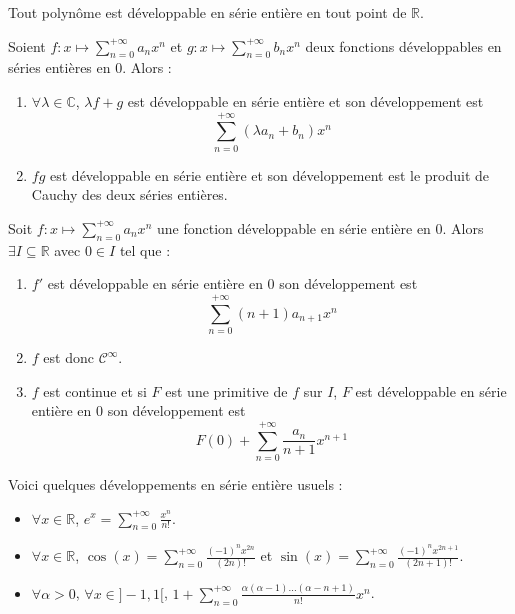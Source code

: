 
  \begin{example}
    Tout polynôme est développable en série entière en tout point de $\mathbb{R}$.
  \end{example}

  \begin{proposition}
    Soient $f : x \mapsto \sum_{n=0}^{+\infty} a_n x^n$ et $g : x \mapsto \sum_{n=0}^{+\infty} b_n x^n$ deux fonctions développables en séries entières en $0$. Alors :
    \begin{enumerate}[label=(\roman*)]
      \item $\forall \lambda \in \mathbb{C}$, $\lambda f + g$ est développable en série entière et son développement est
      \[ \sum_{n=0}^{+\infty} (\lambda a_n + b_n) x^n \]
      \item $fg$ est développable en série entière et son développement est le produit de Cauchy des deux séries entières.
    \end{enumerate}
  \end{proposition}

  \begin{proposition}
    Soit $f : x \mapsto \sum_{n=0}^{+\infty} a_n x^n$ une fonction développable en série entière en $0$. Alors $\exists I \subseteq \mathbb{R}$ avec $0 \in I$ tel que :
    \begin{enumerate}[label=(\roman*)]
      \item $f'$ est développable en série entière en $0$ son développement est
      \[ \sum_{n=0}^{+\infty} (n+1) a_{n+1} x^n \]
      \item $f$ est donc $\mathcal{C}^\infty$.
      \item $f$ est continue et si $F$ est une primitive de $f$ sur $I$, $F$ est développable en série entière en $0$ son développement est
      \[ F(0) + \sum_{n=0}^{+\infty} \frac{a_n}{n+1} x^{n+1} \]
    \end{enumerate}
  \end{proposition}

  \begin{example}
    Voici quelques développements en série entière usuels :
    \begin{itemize}
      \item $\forall x \in \mathbb{R}$, $e^x = \sum_{n=0}^{+\infty} \frac{x^n}{n!}$.
      \item $\forall x \in \mathbb{R}$, $\cos(x) = \sum_{n=0}^{+\infty} \frac{(-1)^n x^{2n}}{(2n)!}$ et $\sin(x) = \sum_{n=0}^{+\infty} \frac{(-1)^n x^{2n+1}}{(2n+1)!}$.
      \item $\forall \alpha > 0$, $\forall x \in ]-1,1[$, $1 + \sum_{n=0}^{+\infty} \frac{\alpha(\alpha - 1) \dots (\alpha - n + 1)}{n!} x^n$.
    \end{itemize}
  \end{example}

